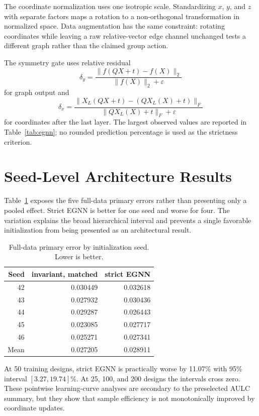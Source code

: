 \documentclass[letterpaper,twocolumn,9pt]{extarticle}
\begin{document}
The coordinate normalization uses one isotropic scale. Standardizing $x$, $y$, and $z$ with separate factors maps a rotation to a non-orthogonal transformation in normalized space. Data augmentation has the same constraint: rotating coordinates while leaving a raw relative-vector edge channel unchanged tests a different graph rather than the claimed group action.

The symmetry gate uses relative residual
\begin{equation}
\delta_y=\frac{\|f(QX+t)-f(X)\|_2}{\|f(X)\|_2+\varepsilon}
\end{equation}
for graph output and
\begin{equation}
\delta_x=\frac{\|X_L(QX+t)-(QX_L(X)+t)\|_F}{\|QX_L(X)+t\|_F+\varepsilon}
\end{equation}
for coordinates after the last layer. The largest observed values are reported in Table~\ref{tab:egnn}; no rounded prediction percentage is used as the strictness criterion.

\section{Seed-Level Architecture Results}
Table~\ref{tab:seed} exposes the five full-data primary errors rather than presenting only a pooled effect. Strict EGNN is better for one seed and worse for four. The variation explains the broad hierarchical interval and prevents a single favorable initialization from being presented as an architectural result.

\begin{table}[t]
\caption{Full-data primary error by initialization seed. Lower is better.}
\label{tab:seed}
\centering
\small
\begin{tabular}{rrr}
\toprule
Seed & invariant, matched & strict EGNN\\
\midrule
42 & 0.030449 & 0.032618\\
43 & 0.027932 & 0.030436\\
44 & 0.029287 & 0.026443\\
45 & 0.023085 & 0.027717\\
46 & 0.025271 & 0.027341\\
\midrule
Mean & 0.027205 & 0.028911\\
\bottomrule
\end{tabular}
\end{table}

At 50 training designs, strict EGNN is practically worse by 11.07\% with 95\% interval $[3.27,19.74]$\%. At 25, 100, and 200 designs the intervals cross zero. These pointwise learning-curve analyses are secondary to the preselected AULC summary, but they show that sample efficiency is not monotonically improved by coordinate updates.
\end{document}
